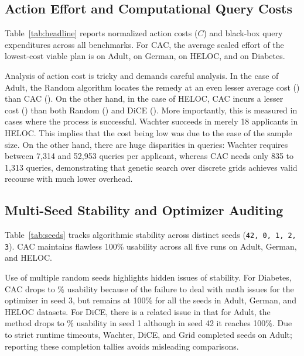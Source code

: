 \documentclass[nolineno]{paper/ieee-access/ieeeaccess}%
\newcommand{\CAC}{CAC}
\newcommand{\artifact}[1]{\nolinkurl{#1}}
\begin{document}
\subsection{Action Effort and Computational Query Costs}
Table~\ref{tab:headline} reports normalized action costs ($C$) and black-box query expenditures across all benchmarks. For \CAC{}, the average scaled effort of the lowest-cost viable plan is \AdultCacCost{} on Adult, \GermanCacCost{} on German, \HelocCacCost{} on HELOC, and \DiabetesCacCost{} on Diabetes.

Analysis of action cost is tricky and demands careful analysis. In the case of Adult, the Random algorithm locates the remedy at an even lesser average cost (\AdultRandomCost{}) than \CAC{} (\AdultCacCost{}). On the other hand, in the case of HELOC, \CAC{} incurs a lesser cost (\HelocCacCost{}) than both Random (\HelocRandomCost{}) and DiCE (\HelocDiceCost{}). More importantly, this is measured in cases where the process is successful. Wachter succeeds in merely 18 applicants in HELOC. This implies that the cost being low was due to the ease of the sample size. On the other hand, there are huge disparities in queries: Wachter requires between 7,314 and 52,953 queries per applicant, whereas \CAC{} needs only 835 to 1,313 queries, demonstrating that genetic search over discrete grids achieves valid recourse with much lower overhead.

\subsection{Multi-Seed Stability and Optimizer Auditing}
Table~\ref{tab:seeds} tracks algorithmic stability across \CacSeeds{} distinct seeds (\artifact{42, 0, 1, 2, 3}). \CAC{} maintains flawless 100\% usability across all five runs on Adult, German, and HELOC.

Use of multiple random seeds highlights hidden issues of stability. For Diabetes, \CAC{} drops to \DiabetesCacSeedMin\% usability because of the failure to deal with math issues for the optimizer in seed 3, but remains at 100\% for all the seeds in Adult, German, and HELOC datasets. For DiCE, there is a related issue in that for Adult, the method drops to \AdultDiceSeedMin\% usability in seed 1 although in seed 42 it reaches 100\%. Due to strict runtime timeouts, Wachter, DiCE, and Grid completed \AdultDiceSeedCount{} seeds on Adult; reporting these completion tallies avoids misleading comparisons.

\begin{table}[t]
\caption{Multi-seed recourse stability across five random seeds (\artifact{42, 0, 1, 2, 3}). Values report mean [minimum, maximum] usability percentages, with the number of completed seed runs in parentheses.}
\label{tab:seeds}
\centering\footnotesize

\end{table}
\end{document}
